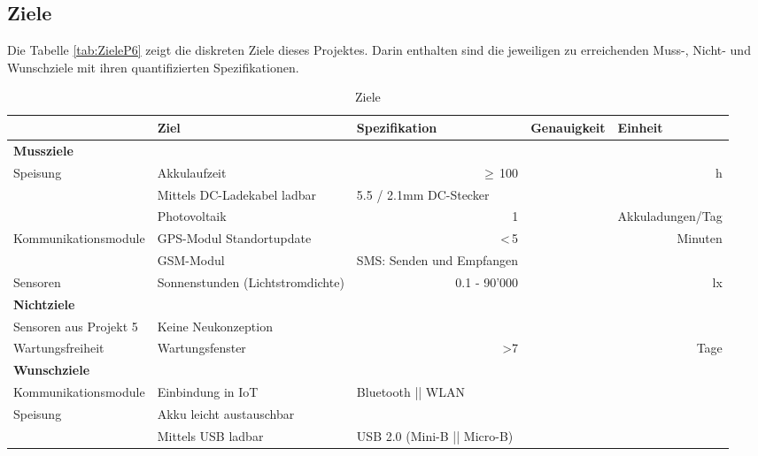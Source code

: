 \begin{landscape}
\subsection{Ziele}
Die Tabelle \ref{tab:ZieleP6} zeigt die diskreten Ziele dieses Projektes. Darin enthalten sind die jeweiligen zu erreichenden Muss-, Nicht- und Wunschziele mit ihren quantifizierten Spezifikationen.\\
\begin{table}[htbp]
  \centering
  \renewcommand{\arraystretch}{1.1} %
  \caption{Ziele}
    \begin{tabular}{l|l|l|r|r}
          & \textbf{Ziel} & \multicolumn{1}{l|}{\textbf{Spezifikation}} & \multicolumn{1}{l|}{\textbf{Genauigkeit}} & \multicolumn{1}{l}{\textbf{Einheit}} \\
    \toprule
    \multicolumn{1}{l}{\textbf{Mussziele}} & \multicolumn{4}{r}{} \\
    \toprule
  \multirow{3}{*}{Speisung} & Akkulaufzeit & \multicolumn{1}{r|}{$\geq$\,100} &   & h \\
    \cline{2-5}  & Mittels DC-Ladekabel ladbar &      5.5 / 2.1mm DC-Stecker &       &  \\
	\cline{2-5}           & Photovoltaik &    \multicolumn{1}{r|}{1}   &       & Akkuladungen/Tag \\
    \hline
  \multirow{2}{*}{Kommunikationsmodule} & GPS-Modul Standortupdate   &  \multicolumn{1}{r|}{<\,5}  &       & Minuten \\
	\cline{2-5}          & GSM-Modul  & SMS: Senden und Empfangen &       &  \\
\hline
Sensoren & Sonnenstunden (Lichtstromdichte) & \multicolumn{1}{r|}{0.1 - 90'000} & & lx \\
    \bottomrule
    \multicolumn{1}{l}{\textbf{Nichtziele}} & \multicolumn{4}{r}{} \\
    \toprule
     Sensoren aus Projekt 5& Keine Neukonzeption &  &  &  \\
     \hline
     Wartungsfreiheit & Wartungsfenster & \multicolumn{1}{r|}{>7} &  & Tage \\
    \bottomrule
    \multicolumn{1}{l}{\textbf{Wunschziele}} & \multicolumn{4}{r}{} \\
    \toprule
    Kommunikationsmodule & Einbindung in IoT &       Bluetooth || WLAN &       &  \\
    \hline
    \multirow{2}{*}{Speisung} & Akku leicht austauschbar &       &       &  \\
\cline{2-5}  & Mittels USB ladbar & USB 2.0 (Mini-B || Micro-B) &       &  \\


\end{tabular}
\end{table}
\end{landscape}
